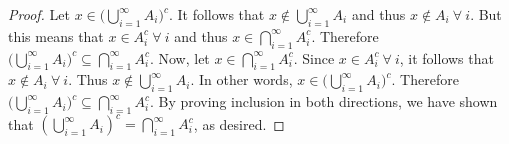 \documentclass[11pt]{article}
\newenvironment{exer}[1]
    {\renewcommand\theinnercustomexer{#1}\innercustomexer\upshape}
    {\endinnercustomexer}
\begin{document}
\begin{exer}{1.2.13}
\begin{enumerate}
            \begin{proof}
                Let $x\in\big(\bigcup_{i=1}^\infty A_i\big)^c$. It follows that $x\notin\bigcup_{i=1}^\infty A_i$ and thus $x\notin A_i~\forall~i$. But this means that $x\in A_i^c~\forall~i$ and thus $x\in\bigcap_{i=1}^\infty A_i^c$. Therefore $\big(\bigcup_{i=1}^\infty A_i\big)^c\subseteq\bigcap_{i=1}^\infty A_i^c$. Now, let $x\in\bigcap_{i=1}^\infty A_i^c$. Since $x\in A_i^c~\forall~i$, it follows that $x\notin A_i~\forall~i$. Thus $x\notin\bigcup_{i=1}^\infty A_i$. In other words, $x\in\big(\bigcup_{i=1}^\infty A_i\big)^c$. Therefore $\big(\bigcup_{i=1}^\infty A_i\big)^c\subseteq\bigcap_{i=1}^\infty A_i^c$. By proving inclusion in both directions, we have shown that $\left(\bigcup_{i=1}^\infty A_i\right)^c=\bigcap_{i=1}^\infty A_i^c$, as desired.
            \end{proof}
    \end{enumerate}
\end{exer}
\end{document}
